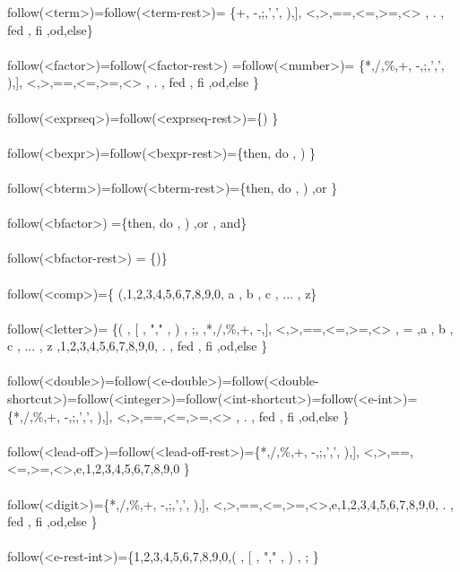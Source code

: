 \documentclass[fleqn]{article}
\begin{document}
follow(<term>)=follow(<term-rest>)= \{+, -,;,',', ),], <,>,==,<=,>=,<> , .  , fed , fi ,od,else\}\\
\\
follow(<factor>)=follow(<factor-rest>) =follow(<number>)=  \{*,/,\%,+, -,;,',', ),], <,>,==,<=,>=,<> , .  , fed , fi ,od,else \}\\
\\
follow(<exprseq>)=follow(<exprseq-rest>)=\{) \}\\
\\
follow(<bexpr>)=follow(<bexpr-rest>)=\{then, do , )  \}\\
\\
follow(<bterm>)=follow(<bterm-rest>)=\{then, do , ) ,or \}\\
\\
follow(<bfactor>) =\{then, do , ) ,or , and\} \\
\\
follow(<bfactor-rest>) = \{)\}\\
\\
follow(<comp>)=\{ (,1,2,3,4,5,6,7,8,9,0, a , b , c , ... , z\}\\
\\
follow(<letter>)= \{( , [ , "," , ) , ;, ,*,/,\%,+, -,], <,>,==,<=,>=,<> , = ,a , b , c , ... , z ,1,2,3,4,5,6,7,8,9,0, .  , fed , fi ,od,else \}\\
\\
follow(<double>)=follow(<e-double>)=follow(<double-shortcut>)=follow(<integer>)=follow(<int-shortcut>)=follow(<e-int>)=\{*,/,\%,+, -,;,',', ),], <,>,==,<=,>=,<> , .  , fed , fi ,od,else \}\\
\\
follow(<lead-off>)=follow(<lead-off-rest>)=\{*,/,\%,+, -,;,',', ),], <,>,==,<=,>=,<>,e,1,2,3,4,5,6,7,8,9,0  \}\\
\\
follow(<digit>)=\{*,/,\%,+, -,;,',', ),], <,>,==,<=,>=,<>,e,1,2,3,4,5,6,7,8,9,0, .  , fed , fi ,od,else   \}\\
\\
follow(<e-rest-int>)=\{1,2,3,4,5,6,7,8,9,0,( , [ , "," , ) , ; \}\\
\\
\end{document}
